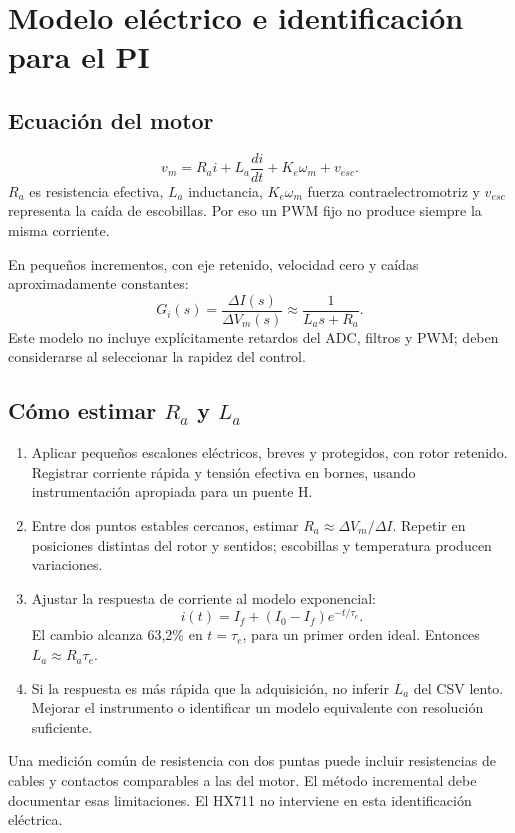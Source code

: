 \documentclass[11pt,a4paper]{article}
\begin{document}
\section{Modelo eléctrico e identificación para el PI}
\subsection{Ecuación del motor}
\begin{equation}
v_m=R_ai+L_a\frac{di}{dt}+K_e\omega_m+v_{esc}.
\end{equation}
$R_a$ es resistencia efectiva, $L_a$ inductancia, $K_e\omega_m$ fuerza contraelectromotriz y $v_{esc}$ representa la caída de escobillas. Por eso un PWM fijo no produce siempre la misma corriente.

En pequeños incrementos, con eje retenido, velocidad cero y caídas aproximadamente constantes:
\begin{equation}
G_i(s)=\frac{\Delta I(s)}{\Delta V_m(s)}\approx\frac{1}{L_as+R_a}.
\end{equation}
Este modelo no incluye explícitamente retardos del ADC, filtros y PWM; deben considerarse al seleccionar la rapidez del control.

\subsection{Cómo estimar $R_a$ y $L_a$}
\begin{enumerate}
\item Aplicar pequeños escalones eléctricos, breves y protegidos, con rotor retenido. Registrar corriente rápida y tensión efectiva en bornes, usando instrumentación apropiada para un puente H.
\item Entre dos puntos estables cercanos, estimar $R_a\approx\Delta V_m/\Delta I$. Repetir en posiciones distintas del rotor y sentidos; escobillas y temperatura producen variaciones.
\item Ajustar la respuesta de corriente al modelo exponencial:
\[
i(t)=I_f+(I_0-I_f)e^{-t/\tau_e}.
\]
El cambio alcanza 63,2\% en $t=\tau_e$, para un primer orden ideal. Entonces $L_a\approx R_a\tau_e$.
\item Si la respuesta es más rápida que la adquisición, no inferir $L_a$ del CSV lento. Mejorar el instrumento o identificar un modelo equivalente con resolución suficiente.
\end{enumerate}
Una medición común de resistencia con dos puntas puede incluir resistencias de cables y contactos comparables a las del motor. El método incremental debe documentar esas limitaciones. El HX711 no interviene en esta identificación eléctrica.
\end{document}
